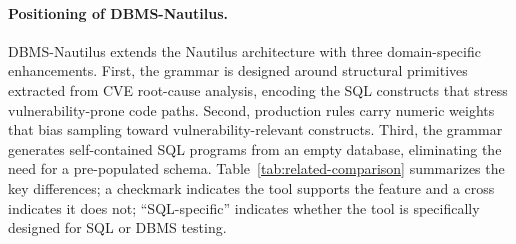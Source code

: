 \paragraph{Positioning of DBMS-Nautilus.}
DBMS-Nautilus extends the Nautilus architecture with three domain-specific enhancements. First, the grammar is designed around structural primitives extracted from CVE root-cause analysis, encoding the SQL constructs that stress vulnerability-prone code paths. Second, production rules carry numeric weights that bias sampling toward vulnerability-relevant constructs. Third, the grammar generates self-contained SQL programs from an empty database, eliminating the need for a pre-populated schema. Table~\ref{tab:related-comparison} summarizes the key differences; a checkmark indicates the tool supports the feature and a cross indicates it does not; ``SQL-specific'' indicates whether the tool is specifically designed for SQL or DBMS testing.

\begin{table}[htbp]
\caption{Comparison of DBMS-Nautilus with related fuzzing tools.}
\label{tab:related-comparison}
\centering
\small
{}
\end{table}

